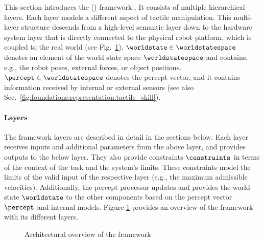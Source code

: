 

This section introduces the \skillmodel{} (\skillmodelabbr{}) framework \cite{Johannsmeier.2019,Johannsmeier.2023}.
It consists of multiple hierarchical layers.
Each layer models a different aspect of tactile manipulation.
This multi-layer structure descends from a high-level semantic layer down to the hardware system layer that is directly connected to the physical robot platform, which is coupled to the real world (see Fig.~\ref{fig:architecture:ggtwrep:overview}).
$\worldstate \in \worldstatespace$ denotes an element of the world state space $\worldstatespace$ and contains, e.g., the robot poses, external forces, or object positions.
$\percept \in \worldstatespace$ denotes the percept vector, and it contains information received by internal or external sensors (see also Sec.~\ref{fig:foundations:representation:tactile_skill}).


\paragraph{Layers}

The framework layers are described in detail in the sections below.
Each layer receives inputs and additional parameters from the above layer, and provides outputs to the below layer.
They also provide constraints $\constraints$ in terms of the context of the task and the system's limits.
These constraints model the limits of the valid input of the respective layer (e.g., the maximum admissible velocities).
Additionally, the percept processor updates and provides the world state $\worldstate$ to the other components based on the percept vector $\percept$ and internal models.
Figure \ref{fig:architecture:ggtwrep:overview} provides an overview of the \skillmodelabbr{} framework with its different layers.

\begin{figure}[ht!]
    \centering
    
    \caption{Architectural overview of the \skillmodelabbr{} framework}
    \label{fig:architecture:ggtwrep:overview}
\end{figure}

